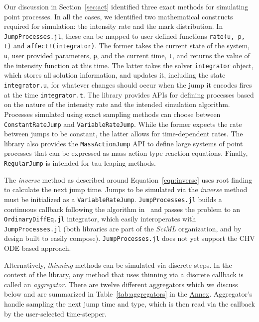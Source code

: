 \documentclass{juliacon}
\numberwithin{equation}{section}
\begin{document}
Our discussion in Section~\ref{sec:act} identified three exact methods for simulating point processes. In all the cases, we identified two mathematical constructs required for simulation: the intensity rate and the mark distribution. In \texttt{JumpProcesses.jl}, these can be mapped to user defined functions \texttt{rate(u, p, t)} and \texttt{affect!(integrator)}. The former takes the current state of the system, \texttt{u}, user provided parameters, \texttt{p}, and the current time, \texttt{t}, and returns the value of the intensity function at this time. The latter takes the solver \texttt{integrator} object, which stores all solution information, and updates it, including the state \texttt{integrator.u}, for whatever changes should occur when the jump it encodes fires at the time \texttt{integrator.t}. The library provides APIs for defining processes based on the nature of the intensity rate and the intended simulation algorithm. Processes simulated using exact sampling methods can choose between \texttt{ConstantRateJump} and \texttt{VariableRateJump}. While the former expects the rate between jumps to be constant, the latter allows for time-dependent rates. The library also provides the \texttt{MassActionJump} API to define large systems of point processes that can be expressed as mass action type reaction equations. Finally, \texttt{RegularJump} is intended for tau-leaping methods.

The \textit{inverse} method as described around Equation~\ref{eqn:inverse} uses root finding to calculate the next jump time. Jumps to be simulated via the \textit{inverse} method must be initialized as a \texttt{VariableRateJump}. \texttt{JumpProcesses.jl} builds a continuous callback following the algorithm in~\cite{salis2005} and passes the problem to an \texttt{OrdinaryDiffEq.jl} integrator, which easily interoperates with \texttt{JumpProcesses.jl} (both libraries are part of the \textit{SciML} organization, and by design built to easily compose). \texttt{JumpProcesses.jl} does not yet support the CHV ODE based approach.

Alternatively, \textit{thinning} methods can be simulated via discrete steps. In the context of the library, any method that uses thinning via a discrete callback is called an \textit{aggregator}. There are twelve different aggregators which we discuss below and are summarized in Table~\ref{tab:aggregators} in the \hyperref[sec:annex]{Annex}. Aggregator's handle sampling the next jump time and type, which is then read via the callback by the user-selected time-stepper.
\end{document}
